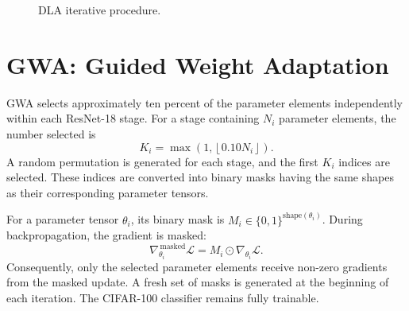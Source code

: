 \documentclass[12pt,a4paper]{report}
\begin{document}
\begin{figure}[H]
\centering
{}
\caption{DLA iterative procedure.}
\label{fig:dla}
\end{figure}

\section{GWA: Guided Weight Adaptation}
GWA selects approximately ten percent of the parameter elements
independently within each ResNet-18 stage. For a stage containing
$N_i$ parameter elements, the number selected is
\[
K_i=\max\left(1,\left\lfloor 0.10N_i\right\rfloor\right).
\]
A random permutation is generated for each stage, and the first
$K_i$ indices are selected. These indices are converted into binary
masks having the same shapes as their corresponding parameter tensors.

For a parameter tensor $\theta_i$, its binary mask is
$M_i\in\{0,1\}^{\mathrm{shape}(\theta_i)}$. During backpropagation,
the gradient is masked:
\[
\nabla_{\theta_i}^{\,\mathrm{masked}}\mathcal{L}
=
M_i\odot\nabla_{\theta_i}\mathcal{L}.
\]
Consequently, only the selected parameter elements receive non-zero
gradients from the masked update. A fresh set of masks is generated at
the beginning of each iteration. The CIFAR-100 classifier remains
fully trainable.
\end{document}
